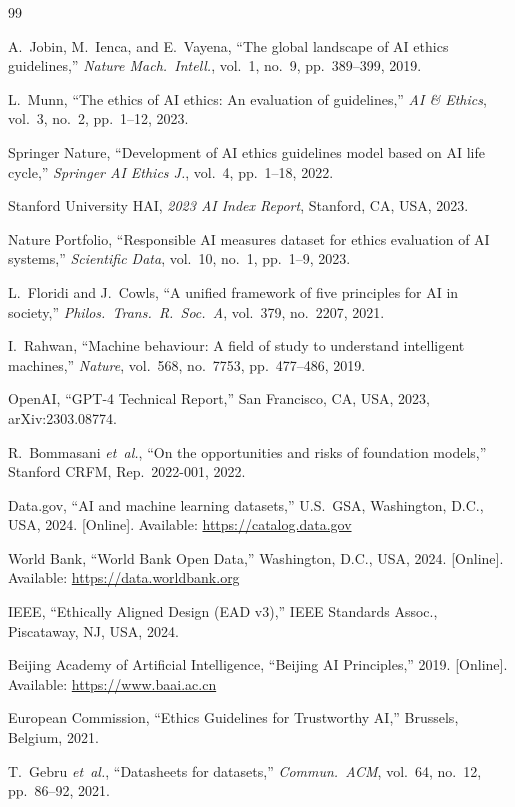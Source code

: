 \documentclass[conference]{IEEEtran}
\begin{document}
\begin{thebibliography}{99}

A.~Jobin, M.~Ienca, and E.~Vayena,
``The global landscape of AI ethics guidelines,''
\textit{Nature Mach.\ Intell.}, vol.~1, no.~9, pp.~389--399, 2019.

L.~Munn,
``The ethics of AI ethics: An evaluation of guidelines,''
\textit{AI \& Ethics}, vol.~3, no.~2, pp.~1--12, 2023.

Springer Nature,
``Development of AI ethics guidelines model based on AI life cycle,''
\textit{Springer AI Ethics J.}, vol.~4, pp.~1--18, 2022.

Stanford University HAI,
\textit{2023 AI Index Report},
Stanford, CA, USA, 2023.

Nature Portfolio,
``Responsible AI measures dataset for ethics evaluation of AI systems,''
\textit{Scientific Data}, vol.~10, no.~1, pp.~1--9, 2023.

L.~Floridi and J.~Cowls,
``A unified framework of five principles for AI in society,''
\textit{Philos.\ Trans.\ R.\ Soc.\ A}, vol.~379, no.~2207, 2021.

I.~Rahwan,
``Machine behaviour: A field of study to understand intelligent machines,''
\textit{Nature}, vol.~568, no.~7753, pp.~477--486, 2019.

OpenAI,
``GPT-4 Technical Report,''
San Francisco, CA, USA, 2023, arXiv:2303.08774.

R.~Bommasani \textit{et~al.},
``On the opportunities and risks of foundation models,''
Stanford CRFM, Rep.\ 2022-001, 2022.

Data.gov,
``AI and machine learning datasets,''
U.S.\ GSA, Washington, D.C., USA, 2024.
[Online]. Available: \url{https://catalog.data.gov}

World Bank,
``World Bank Open Data,''
Washington, D.C., USA, 2024.
[Online]. Available: \url{https://data.worldbank.org}

IEEE,
``Ethically Aligned Design (EAD v3),''
IEEE Standards Assoc., Piscataway, NJ, USA, 2024.

Beijing Academy of Artificial Intelligence,
``Beijing AI Principles,''
2019. [Online]. Available: \url{https://www.baai.ac.cn}

European Commission,
``Ethics Guidelines for Trustworthy AI,''
Brussels, Belgium, 2021.

T.~Gebru \textit{et~al.},
``Datasheets for datasets,''
\textit{Commun.\ ACM}, vol.~64, no.~12, pp.~86--92, 2021.

\end{thebibliography}
\end{document}
